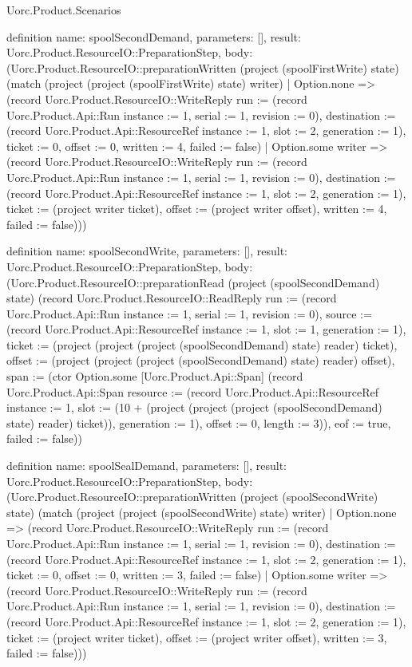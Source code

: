 \begin{lexlean}{Uorc.Product.Scenarios}
\begin{semanticmodule}
definition{
  name: spoolSecondDemand,
  parameters: [],
  result: Uorc.Product.ResourceIO::PreparationStep,
  body: (Uorc.Product.ResourceIO::preparationWritten (project (spoolFirstWrite) state) (match (project (project (spoolFirstWrite) state) writer)
    | Option.none => (record Uorc.Product.ResourceIO::WriteReply {run := (record Uorc.Product.Api::Run {instance := 1, serial := 1, revision := 0}), destination := (record Uorc.Product.Api::ResourceRef {instance := 1, slot := 2, generation := 1}), ticket := 0, offset := 0, written := 4, failed := false})
    | Option.some writer => (record Uorc.Product.ResourceIO::WriteReply {run := (record Uorc.Product.Api::Run {instance := 1, serial := 1, revision := 0}), destination := (record Uorc.Product.Api::ResourceRef {instance := 1, slot := 2, generation := 1}), ticket := (project writer ticket), offset := (project writer offset), written := 4, failed := false})))
}

definition{
  name: spoolSecondWrite,
  parameters: [],
  result: Uorc.Product.ResourceIO::PreparationStep,
  body: (Uorc.Product.ResourceIO::preparationRead (project (spoolSecondDemand) state) (record Uorc.Product.ResourceIO::ReadReply {run := (record Uorc.Product.Api::Run {instance := 1, serial := 1, revision := 0}), source := (record Uorc.Product.Api::ResourceRef {instance := 1, slot := 1, generation := 1}), ticket := (project (project (project (spoolSecondDemand) state) reader) ticket), offset := (project (project (project (spoolSecondDemand) state) reader) offset), span := (ctor Option.some [Uorc.Product.Api::Span] (record Uorc.Product.Api::Span {resource := (record Uorc.Product.Api::ResourceRef {instance := 1, slot := (10 + (project (project (project (spoolSecondDemand) state) reader) ticket)), generation := 1}), offset := 0, length := 3})), eof := true, failed := false}))
}

definition{
  name: spoolSealDemand,
  parameters: [],
  result: Uorc.Product.ResourceIO::PreparationStep,
  body: (Uorc.Product.ResourceIO::preparationWritten (project (spoolSecondWrite) state) (match (project (project (spoolSecondWrite) state) writer)
    | Option.none => (record Uorc.Product.ResourceIO::WriteReply {run := (record Uorc.Product.Api::Run {instance := 1, serial := 1, revision := 0}), destination := (record Uorc.Product.Api::ResourceRef {instance := 1, slot := 2, generation := 1}), ticket := 0, offset := 0, written := 3, failed := false})
    | Option.some writer => (record Uorc.Product.ResourceIO::WriteReply {run := (record Uorc.Product.Api::Run {instance := 1, serial := 1, revision := 0}), destination := (record Uorc.Product.Api::ResourceRef {instance := 1, slot := 2, generation := 1}), ticket := (project writer ticket), offset := (project writer offset), written := 3, failed := false})))
}


\end{semanticmodule}
\end{lexlean}
